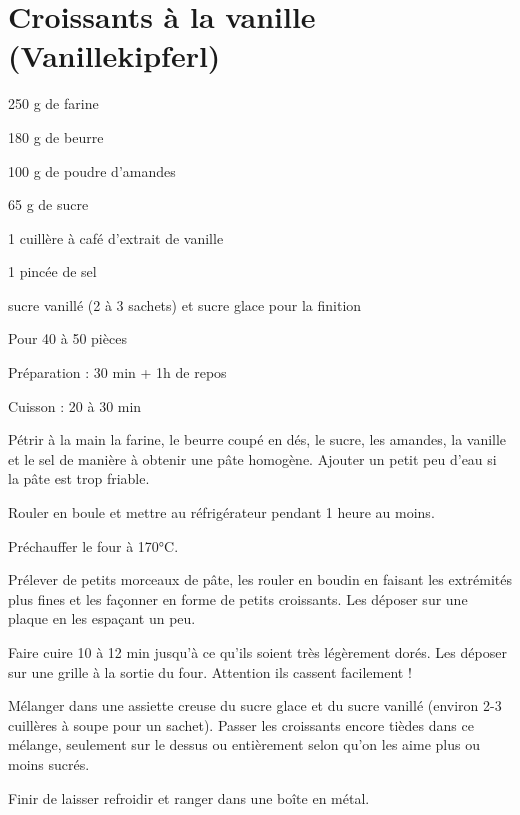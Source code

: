 \section{Croissants à la vanille (Vanillekipferl)}

\begin{ingredients}
\item 250 g de farine
\item 180 g de beurre
\item 100 g de poudre d'amandes
\item 65 g de sucre
\item 1 cuillère à café d'extrait de vanille
\item 1 pincée de sel
\item sucre vanillé (2 à 3 sachets) et sucre glace pour la finition
\end{ingredients}
\begin{infos}
\item Pour 40 à 50 pièces		%
\item Préparation : 30 min + 1h de repos		%
\item Cuisson : 20 à 30 min		%
\end{infos}
\begin{etapes}
\item Pétrir à la main la farine, le beurre coupé en dés, le sucre, les amandes, la vanille et le sel de manière à obtenir une pâte homogène. Ajouter un petit peu d'eau si la pâte est trop friable.
\item Rouler en boule et mettre au réfrigérateur pendant 1 heure au moins.
\item Préchauffer le four à 170°C.
\item Prélever de petits morceaux de pâte, les rouler en boudin en faisant les extrémités plus fines et les façonner en forme de petits croissants. Les déposer sur une plaque en les espaçant un peu.
\item Faire cuire 10 à 12 min jusqu'à ce qu'ils soient très légèrement dorés. Les déposer sur une grille à la sortie du four. Attention ils cassent facilement !
\item Mélanger dans une assiette creuse du sucre glace et du sucre vanillé (environ 2-3 cuillères à soupe pour un sachet). Passer les croissants encore tièdes dans ce mélange, seulement sur le dessus ou entièrement selon qu'on les aime plus ou moins sucrés.
\item Finir de laisser refroidir et ranger dans une boîte en métal.
\end{etapes}
\begin{conseils}
\end{conseils}
